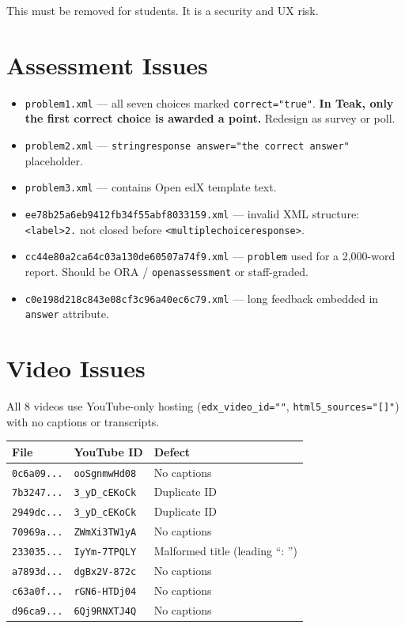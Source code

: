 This must be removed for students. It is a security and UX risk.

\section{Assessment Issues}

\begin{itemize}
  \item \texttt{problem1.xml} — all seven choices marked
        \texttt{correct="true"}. \textbf{In Teak, only the first correct
        choice is awarded a point.} Redesign as survey or poll.
  \item \texttt{problem2.xml} — \texttt{stringresponse
        answer="the correct answer"} placeholder.
  \item \texttt{problem3.xml} — contains Open edX template text.
  \item \texttt{ee78b25a6eb9412fb34f55abf8033159.xml} — invalid XML
        structure: \texttt{<label>2.} not closed before
        \texttt{<multiplechoiceresponse>}.
  \item \texttt{cc44e80a2ca64c03a130de60507a74f9.xml} — \texttt{problem}
        used for a 2{,}000-word report. Should be ORA /
        \texttt{openassessment} or staff-graded.
  \item \texttt{c0e198d218c843e08cf3c96a40ec6c79.xml} — long feedback
        embedded in \texttt{answer} attribute.
\end{itemize}

\section{Video Issues}

All 8 videos use YouTube-only hosting
(\texttt{edx\_video\_id=""}, \texttt{html5\_sources="[]"}) with no
captions or transcripts.

\begin{table}[h]
\centering
\small
\begin{tabular}{@{}lll@{}}
\toprule
\textbf{File} & \textbf{YouTube ID} & \textbf{Defect} \\
\midrule
\texttt{0c6a09...} & \texttt{ooSgnmwHd08} & No captions \\
\texttt{7b3247...} & \texttt{3\_yD\_cEKoCk} & Duplicate ID \\
\texttt{2949dc...} & \texttt{3\_yD\_cEKoCk} & Duplicate ID \\
\texttt{70969a...} & \texttt{ZWmXi3TW1yA} & No captions \\
\texttt{233035...} & \texttt{IyYm-7TPQLY} & Malformed title (leading ``: '') \\
\texttt{a7893d...} & \texttt{dgBx2V-872c} & No captions \\
\texttt{c63a0f...} & \texttt{rGN6-HTDj04} & No captions \\
\texttt{d96ca9...} & \texttt{6Qj9RNXTJ4Q} & No captions \\
\bottomrule
\end{tabular}
\end{table}


